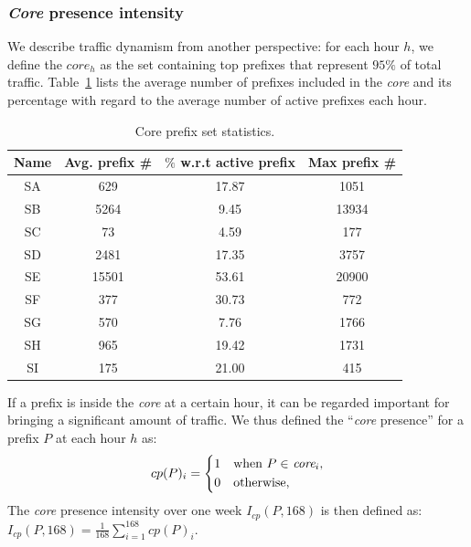\subsubsection{\textit{Core} presence intensity}

We describe traffic dynamism from another perspective:
for each hour $h$, we define the $core_h$ as the set containing top prefixes that represent $95\%$ of total traffic. 
Table~\ref{tab:core_size} lists the average number of prefixes included in the \textit{core} and its percentage with regard to the average number of active prefixes each hour. 

\begin{table}[!htb]
\centering
\begin{tabular}{cccc}\toprule
\textbf{Name} & \textbf{Avg. prefix \#} & \textbf{$\%$ w.r.t active prefix} & \textbf{Max prefix \#}\\
\midrule
SA & 629  & 17.87  & 1051\\
SB & 5264 & 9.45  & 13934\\
SC & 73  & 4.59    & 177\\
SD & 2481  & 17.35 & 3757\\
SE & 15501  & 53.61 & 20900\\
SF & 377  & 30.73    & 772\\
SG & 570 & 7.76    & 1766\\
SH & 965  & 19.42   & 1731\\
SI & 175  & 21.00    & 415\\
\bottomrule
\end{tabular}
\caption{Core prefix set statistics.}
\label{tab:core_size}
\end{table}

If a prefix is inside the \textit{core} at a certain hour, it can be regarded important for bringing a significant amount of traffic.
We thus defined the ``\textit{core} presence'' for a prefix $P$ at each hour $h$ as:
\begin{equation*}
cp(P)_i = \begin{dcases*}
        1  & when $P \in$ $\textit{core}_i$,\\
        0 & otherwise,
        \end{dcases*}
\label{eq:cp}
\end{equation*}
The \textit{core} presence intensity over one week $I_{cp}(P, 168)$ is then defined as:
$I_{cp}(P,168) = \frac{1}{168} \sum_{i=1}^{168} cp(P)_i$.

